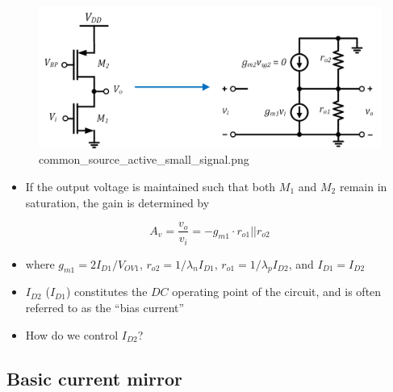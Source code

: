 \documentclass[11pt]{article}
\providecommand{\tightlist}{%
      \setlength{\itemsep}{0pt}\setlength{\parskip}{0pt}}
\begin{document}
    \begin{figure}
\centering
\includegraphics{common_source_active_small_signal.png}
\caption{common\_source\_active\_small\_signal.png}
\end{figure}

    \begin{itemize}
\tightlist
\item
  If the output voltage is maintained such that both \(M_1\) and \(M_2\)
  remain in saturation, the gain is determined by
\end{itemize}

\begin{equation}
A_v = \dfrac{v_o}{v_i} = -g_{m1}\cdot r_{o1}||r_{o2}
\end{equation}

\begin{itemize}
\tightlist
\item
  where \(g_{m1} = 2I_{D1}/V_{OV1}\), \(r_{o2} = 1/\lambda_n I_{D1}\),
  \(r_{o1} = 1/\lambda_p I_{D2}\), and \(I_{D1} = I_{D2}\)
\item
  \(I_{D2}\) (\(I_{D1}\)) constitutes the \(DC\) operating point of the
  circuit, and is often referred to as the ``bias current''
\item
  How do we control \(I_{D2}\)?
\end{itemize}

    \hypertarget{basic-current-mirror}{%
\subsection{Basic current mirror}\label{basic-current-mirror}}
\end{document}
